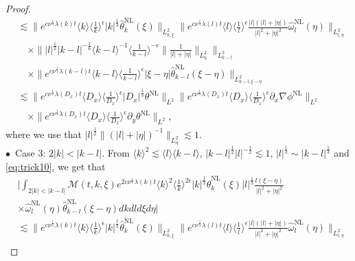 \documentclass[reqno, 12pt]{amsart} %
\theoremstyle{plain} %
\theoremstyle{definition}
\theoremstyle{remark}
\numberwithin{equation}{section} %
\newcommand{\px}{\partial_x}
\newcommand{\py}{\partial_y}
\begin{document}
\begin{proof}
\begin{align*}
			& \lesssim\|e^{c \nu^{\frac{1}{3}} \lambda(k) t}  \langle k \rangle \langle \frac1k \rangle^\epsilon |k|^\frac13  \hat{\theta}_k^{\mathrm{NL}}(\xi)\|_{L_{k, \xi}^2}\|e^{c \nu^{\frac{1}{3}} \lambda(l) t}\langle l\rangle\langle\frac{1}{l}\rangle^\epsilon   \frac{|l|(|l|+|\eta|)}{|l|^2  + |\eta|^2} \hat{\omega}_l^{\mathrm{NL}}(\eta)\|_{L_{l, \eta}^2}         \\
			& \quad \times \||l|^\frac12 |k-l|^{-\frac16}\langle k- l\rangle^{-1}\langle\frac{1}{k-l}\rangle^{-\epsilon}   \| \frac{1}{|l| + | \eta|} \|_{L_{\eta}^2}\|_{L_{k-l}^2}  \\
			& \quad \times  \|e^{c \nu^{\frac{1}{3}} \lambda(k-l) t}\langle k-l \rangle  \langle \frac{1}{k-l} \rangle^\epsilon   |\xi - \eta|    \hat{\theta}_{k-l}^{\mathrm{NL}}(\xi-\eta)\|_{L_{k-l, \xi-\eta}^2} \\
			& \lesssim\|e^{c \nu^{\frac{1}{3}} \lambda\left(D_x\right) t}\langle D_x\rangle    \langle \frac{1}{D_x}\rangle^\epsilon  \left|D_x\right|^{\frac{1}{3}} \theta^{\mathrm{NL}}\|_{L^2} \|e^{c \nu^{\frac{1}{3}} \lambda\left(D_x\right) t}\langle D_x\rangle\langle\frac{1}{D_x}\rangle^\epsilon \px \nabla \phi^{\mathrm{NL}}\|_{L^2} \\
			& \quad \times\|e^{c \nu^{\frac{1}{3}} \lambda\left(D_x\right) t}\langle D_x\rangle\langle\frac{1}{D_x}\rangle^\epsilon \py  \theta^{\mathrm{NL}}\|_{L^2},
		\end{align*}
		where we use that $|l|^\frac12 \| (|l|+|\eta|)^{-1}\|_{L_\eta^2} \lesssim 1$. \\
		$\bullet$~Case 3:   $2|k| < |k-l| $. From $ \langle k \rangle^2 \lesssim \langle l \rangle \langle k-l \rangle$, $|k-l|^\frac12 |l|^{-\frac12} \lesssim 1$, $|l|^\frac13 \sim |k-l|^\frac13$ and \eqref{eq:trick10},  we get that
		\begin{align*}
			& \bigg| \int_{2|k| <|k-l| } \mathcal{M}(t, k, \xi) e^{2 c \nu^{\frac{1}{3}} \lambda(k) t}\langle k\rangle^2\langle\frac{1}{k}\rangle^{2 \epsilon} |k|^\frac13\hat{\theta}_k^{\mathrm{NL}}(\xi) |l|^\frac13  \frac{l(\xi - \eta)}{|l|^2+|\eta|^2}  \\
			& \times \hat{\omega}_l^{\mathrm{NL}}(\eta) \hat{\theta}_{k-l}^{\mathrm{NL}}(\xi-\eta) d k d l d \xi d \eta \bigg| \\
			& \lesssim\|e^{c \nu^{\frac{1}{3}} \lambda(k) t}  \langle k \rangle \langle \frac1k \rangle^\epsilon |k|^\frac13  \hat{\theta}_k^{\mathrm{NL}}(\xi)\|_{L_{k, \xi}^2}\|e^{c \nu^{\frac{1}{3}} \lambda(l) t}\langle l\rangle\langle\frac{1}{l}\rangle^\epsilon   \frac{|l|(|l| + |\eta|)}{|l|^2  + |\eta|^2} \hat{\omega}_l^{\mathrm{NL}}(\eta)\|_{L_{l, \eta}^2}         \\

\end{align*}
\end{proof}
\end{document}
